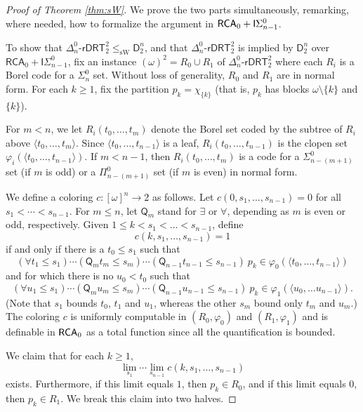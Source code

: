 \documentclass{amsart}
\theoremstyle{definition}
\theoremstyle{remark}
\newcommand{\system}[1]{\mbox{\fontfamily{cmss}\fontshape{n}\fontseries{m}%
    \selectfont#1}}
\newcommand{\RCA}{\system{RCA}\ensuremath{_0}}
\begin{document}
\begin{proof}[Proof of Theorem \ref{thm:sW}]
We prove the two parts simultaneously, remarking, where needed, how to formalize the argument in $\RCA+\mathsf{I}\Sigma^0_{n-1}$.
	
To show that $\Delta^0_n$-$\mathsf{rDRT}^2_2 \leq_{\mathrm{sW}} \mathsf{D}^n_2$, and that $\Delta^0_n$-$\mathsf{rDRT}^2_2$ is implied by $\mathsf{D}^n_2$ over 
$\mathsf{RCA}_0+\mathsf{I}\Sigma^0_{n-1}$, fix an instance $(\omega)^2 = R_0 \cup R_1$ of $\Delta^0_n$-$\mathsf{rDRT}^2_2$ where each $R_i$ is a Borel code for a 
$\Sigma^0_n$ set. Without loss of generality, $R_0$ and $R_1$ are in normal form. For each $k \geq 1$, fix the partition $p_k = \chi_{\{k\}}$ (that is, $p_k$ has blocks $\omega\setminus \{k\}$ and $\{k\}$).
 
For $m < n$, we let $R_i(t_0, \ldots, t_m)$ denote the Borel set coded by the subtree of $R_i$ above $\langle t_0, \ldots, t_m \rangle$. Since 
$\langle t_0, \ldots, t_{n-1} \rangle$ is a leaf, $R_i(t_0, \ldots, t_{n-1})$ is the clopen set $\varphi_i(\langle t_0, \ldots, t_{n-1} \rangle)$. If $m < n-1$, then 
$R_i(t_0, \ldots, t_m)$ is a code for a $\Sigma^0_{n-(m+1)}$ set (if $m$ is odd) or a $\Pi^0_{n-(m+1)}$ set (if $m$ is even) in normal form. 

We define a coloring $c : [\omega]^n \to 2$ as follows. Let $c(0, s_1, \ldots, s_{n-1}) = 0$ for all $s_1 < \cdots < s_{n-1}$. For $m \leq n$, let $\mathsf{Q}_m$ 
stand for $\exists$ or $\forall$, depending as $m$ is even or odd, respectively. Given $1 \leq k < s_1 < \ldots < s_{n-1}$, define
	\[
		c(k,s_1,\ldots,s_{n-1}) = 1
	\]
	if and only if there is a $t_0 \leq s_1$ such that 
	\[
	(\forall t_1 \leq s_1) \cdots (\mathsf{Q}_m t_m \leq s_m) \cdots (\mathsf{Q}_{n-1} t_{n-1} \leq s_{n-1})~p_k \in \varphi_0(\langle t_0, \ldots, t_{n-1} \rangle)
	\]
	and for which there is no $u_0 < t_0$ such that 
	\[
	(\forall u_1 \leq s_1) \cdots (\mathsf{Q}_m u_m \leq s_m) \cdots (\mathsf{Q}_{n-1} u_{n-1} \leq s_{n-1})~p_k \in \varphi_1(\langle u_0, \ldots u_{n-1} \rangle).
	\]
(Note that $s_1$ bounds $t_0$, $t_1$ and $u_1$, whereas the other $s_m$ bound only $t_m$ and $u_m$.) The coloring $c$ is uniformly computable in $(R_0, \varphi_0)$ 
and $(R_1,\varphi_1)$ and is definable in $\RCA$ as a total function since all the quantification is bounded.
	
We claim that for each $k \geq 1$,
	\[
		\lim_{s_1} \cdots \lim_{s_{n-1}} c(k,s_1,\ldots, s_{n-1})
	\]
exists. Furthermore, if this limit equals $1$, then $p_k \in R_0$, and if this limit equals $0$, then $p_k \in R_1$. We break this claim into two halves.
	

\end{proof}
\end{document}

